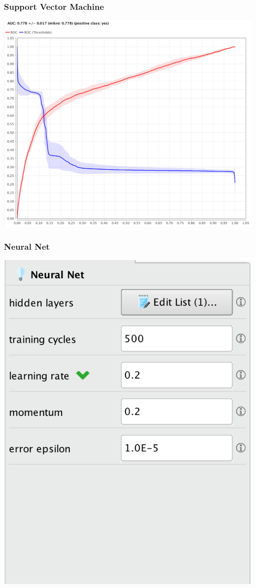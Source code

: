 \documentclass{beamer}
\begin{document}
\begin{frame}
	\frametitle{Support Vector Machine}
  \includegraphics[width=\textwidth,height=\textheight,keepaspectratio]{svm-roc}
\end{frame}

\begin{frame}
	\frametitle{Neural Net}
  \includegraphics[width=\textwidth,height=\textheight,keepaspectratio]{nn-opt}
\end{frame}
\end{document}
